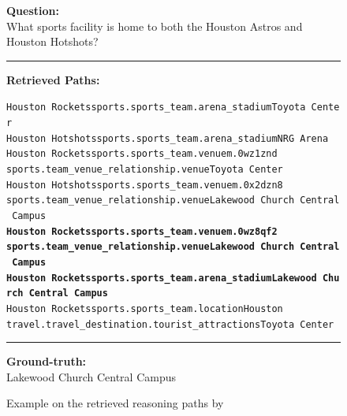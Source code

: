 \begin{figure}[t]
\begin{tcolorbox}[colback=gray!5!white,
                  colframe=gray!75!black,
                  title=CWQ-WebQTrn-2569\_712922724a260d96fea082856cd21d6b]
\scriptsize

\textbf{Question:}\\
What sports facility is home to both the Houston Astros and Houston Hotshots?

\rule{\linewidth}{0.4pt}

\textbf{Retrieved Paths:}\\[2pt]
{\raggedright
\texttt{Houston Rockets\patharrow sports.sports\_team.arena\_stadium\patharrow Toyota Center}\\[6pt]

\texttt{Houston Hotshots\patharrow sports.sports\_team.arena\_stadium\patharrow NRG Arena}\\[6pt]

\texttt{Houston Rockets\patharrow sports.sports\_team.venue\patharrow m.0wz1znd\patharrow \\ sports.team\_venue\_relationship.venue\patharrow Toyota Center}\\[6pt]

\texttt{Houston Hotshots\patharrow sports.sports\_team.venue\patharrow m.0x2dzn8\patharrow \\ sports.team\_venue\_relationship.venue\patharrow Lakewood Church Central Campus}\\[6pt]

\texttt{\textbf{Houston Rockets\patharrow sports.sports\_team.venue\patharrow m.0wz8qf2\patharrow \\ sports.team\_venue\_relationship.venue\patharrow Lakewood Church Central Campus}}\\[6pt]

\texttt{\textbf{Houston Rockets\patharrow sports.sports\_team.arena\_stadium\patharrow Lakewood Church Central Campus}}\\[6pt]

\texttt{Houston Rockets\patharrow sports.sports\_team.location\patharrow Houston\patharrow \\ travel.travel\_destination.tourist\_attractions\patharrow Toyota Center}\\[6pt]

\par}

\rule{\linewidth}{0.4pt}

\textbf{Ground-truth:}\\
Lakewood Church Central Campus

\end{tcolorbox}
\caption{Example on the retrieved reasoning paths by \proj}
\label{fig:example10}
\end{figure}

